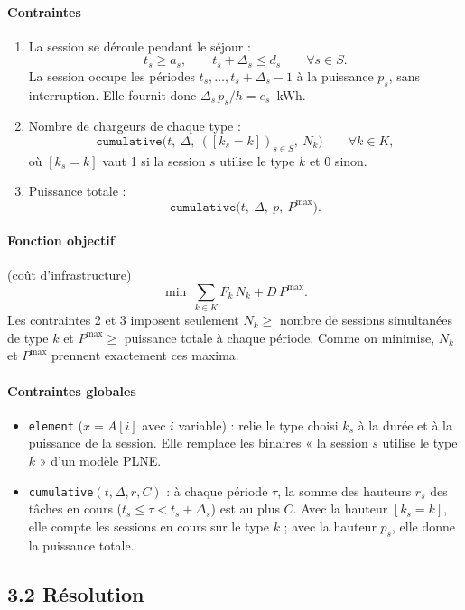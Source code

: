 \documentclass{article}
\begin{document}
\paragraph{Contraintes}
\begin{enumerate}
  \item La session se déroule pendant le séjour :
  \[ t_s \geq a_s, \qquad t_s + \Delta_s \leq d_s \qquad \forall s \in S. \]
  La session occupe les périodes $t_s, \dots, t_s + \Delta_s - 1$ à la puissance $p_s$, sans interruption. Elle fournit donc $\Delta_s\,p_s/h = e_s$~kWh.
  \item Nombre de chargeurs de chaque type :
  \[ \texttt{cumulative}\big(t,\ \Delta,\ ([k_s = k])_{s \in S},\ N_k\big) \qquad \forall k \in K, \]
  où $[k_s = k]$ vaut 1 si la session $s$ utilise le type $k$ et 0 sinon.
  \item Puissance totale :
  \[ \texttt{cumulative}\big(t,\ \Delta,\ p,\ P^{\max}\big). \]
\end{enumerate}

\paragraph{Fonction objectif} (coût d'infrastructure)
\[ \min\ \sum_{k \in K} F_k\, N_k + D\, P^{\max}. \]
Les contraintes 2 et 3 imposent seulement $N_k \geq$ nombre de sessions simultanées de type $k$ et $P^{\max} \geq$ puissance totale à chaque période. Comme on minimise, $N_k$ et $P^{\max}$ prennent exactement ces maxima.

\paragraph{Contraintes globales}
\begin{itemize}
  \item \texttt{element} ($x = A[i]$ avec $i$ variable) : relie le type choisi $k_s$ à la durée et à la puissance de la session. Elle remplace les binaires « la session $s$ utilise le type $k$ » d'un modèle PLNE.
  \item \texttt{cumulative}$(t, \Delta, r, C)$ : à chaque période $\tau$, la somme des hauteurs $r_s$ des tâches en cours ($t_s \leq \tau < t_s + \Delta_s$) est au plus $C$. Avec la hauteur $[k_s = k]$, elle compte les sessions en cours sur le type $k$ ; avec la hauteur $p_s$, elle donne la puissance totale.
\end{itemize}

\subsection*{3.2 Résolution}
\end{document}
